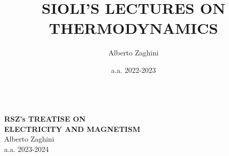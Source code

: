 \documentclass[10pt, oneside]{book}
\title{SIOLI'S LECTURES ON THERMODYNAMICS}
\author{Alberto Zaghini}
\date{a.a. 2022-2023}
\begin{document}

\makeatletter
\begin{titlepage}
\vspace{-2.1cm}
\hspace{0cm}
\vfill
\color{white}
\, \\\larger[20]\textsf{\textbf{RSZ's TREATISE ON\\ELECTRICITY AND MAGNETISM}}
\\\smaller[2]Alberto Zaghini
\\a.a. 2023-2024
\\~\\ \larger[20]\,\,
\\~\\ \,\,

\vfill
\hspace{0cm}
\end{titlepage}
\makeatother
{}
\end{document}
